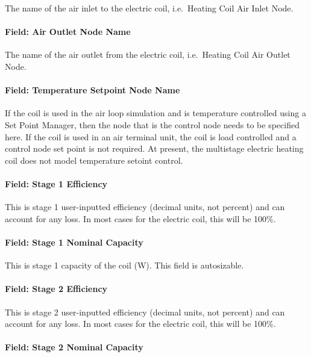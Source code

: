 The name of the air inlet to the electric coil, i.e.~Heating Coil Air Inlet Node.

\paragraph{Field: Air Outlet Node Name}\label{field-air-outlet-node-name-4-001}

The name of the air outlet from the electric coil, i.e.~Heating Coil Air Outlet Node.

\paragraph{Field: Temperature Setpoint Node Name}\label{field-temperature-setpoint-node-name-2}

If the coil is used in the air loop simulation and is temperature controlled using a Set Point Manager, then the node that is the control node needs to be specified here. If the coil is used in an air terminal unit, the coil is load controlled and a control node set point is not required. At present, the multistage electric heating coil does not model temperature setoint control.

\paragraph{Field: Stage 1 Efficiency}\label{field-stage-1-efficiency}

This is stage 1 user-inputted efficiency (decimal units, not percent) and can account for any loss. In most cases for the electric coil, this will be 100\%.

\paragraph{Field: Stage 1 Nominal Capacity}\label{field-stage-1-nominal-capacity}

This is stage 1 capacity of the coil (W). This field is autosizable.

\paragraph{Field: Stage 2 Efficiency}\label{field-stage-2-efficiency}

This is stage 2 user-inputted efficiency (decimal units, not percent) and can account for any loss. In most cases for the electric coil, this will be 100\%.

\paragraph{Field: Stage 2 Nominal Capacity}\label{field-stage-2-nominal-capacity}

